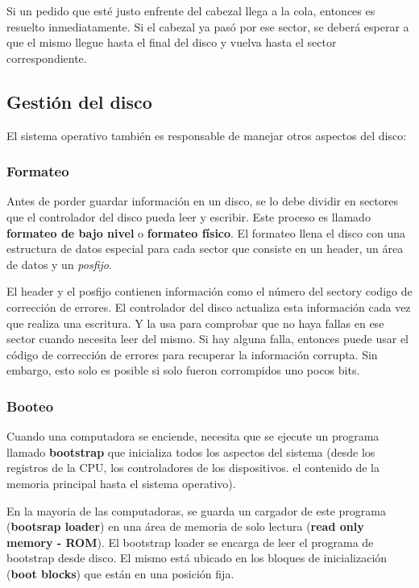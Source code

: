 Si un pedido que esté justo enfrente del cabezal llega a la cola, entonces es resuelto inmediatamente. Si el cabezal ya pasó por ese sector, se deberá esperar a que el mismo llegue hasta el final del disco y vuelva hasta el sector correspondiente.

\subsection{Gestión del disco}
El sistema operativo también es responsable de manejar otros aspectos del disco:

\subsubsection{Formateo} 
Antes de porder guardar información en un disco, se lo debe dividir en sectores que el controlador del disco pueda leer y escribir. Este proceso es llamado \textbf{formateo de bajo nivel} o \textbf{formateo físico}. El formateo llena el disco con una estructura de datos especial para cada sector que consiste en un header, un área de datos y un \textit{posfijo}.

El header y el posfijo contienen información como el número del sectory codigo de corrección de errores. El controlador del disco actualiza esta información cada vez que realiza una escritura. Y la usa para comprobar que no haya fallas en ese sector cuando necesita leer del mismo. Si hay alguna falla, entonces puede usar el código de corrección de errores para recuperar la información corrupta. Sin embargo, esto solo es posible si solo fueron corrompidos uno pocos bits.

\subsubsection{Booteo} 
Cuando una computadora se enciende, necesita que se ejecute un programa llamado \textbf{bootstrap} que inicializa todos los aspectos del sistema (desde los registros de la CPU, los controladores de los dispositivos. el contenido de la memoria principal hasta el sistema operativo).

En la mayoria de las computadoras, se guarda un cargador de este programa (\textbf{bootsrap loader}) en una área de memoria de solo lectura (\textbf{read only memory - ROM}). El bootstrap loader se encarga de leer el programa de bootstrap desde disco. El mismo está ubicado en los bloques de inicialización (\textbf{boot blocks}) que están en una posición fija. 

